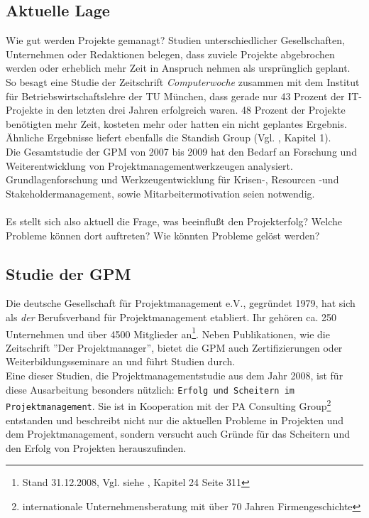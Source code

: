 \documentclass[12pt]{scrartcl}
\begin{document}
\subsection{Aktuelle Lage}

Wie gut werden Projekte gemanagt? Studien unterschiedlicher Gesellschaften, Unternehmen oder Redaktionen belegen, dass zuviele Projekte abgebrochen werden oder erheblich mehr Zeit in Anspruch nehmen als ursprünglich geplant. So besagt eine Studie der Zeitschrift \textit{Computerwoche} zusammen mit dem Institut für Betriebswirtschaftslehre der TU München, dass gerade nur 43 Prozent der IT-Projekte in den letzten drei Jahren erfolgreich waren. 48 Prozent der Projekte benötigten mehr Zeit, kosteten mehr oder hatten ein nicht geplantes Ergebnis.\\
Ähnliche Ergebnisse liefert ebenfalls die Standish Group (Vgl. \cite{profPM}, Kapitel 1). \\
Die Gesamtstudie der GPM von 2007 bis 2009 hat den Bedarf an Forschung und Weiterentwicklung von Projektmanagementwerkzeugen analysiert. Grundlagenforschung und Werkzeugentwicklung für Krisen-, Resourcen -und Stakeholdermanagement, sowie Mitarbeitermotivation seien notwendig.\\
\\
Es stellt sich also aktuell die Frage, was beeinflußt den Projekterfolg? Welche Probleme können dort auftreten? Wie könnten Probleme gelöst werden?

\subsection{Studie der GPM}
\label{studies_gpm}

Die deutsche Gesellschaft für Projektmanagement e.V., gegründet 1979, hat sich als \textit{der} Berufsverband für Projektmanagement etabliert. Ihr gehören ca. 250 Unternehmen und  über 4500 Mitglieder an\footnote{Stand 31.12.2008, Vgl. siehe \cite{proj_zum_erfolg_fuehren}, Kapitel 24 Seite 311}. Neben Publikationen, wie die Zeitschrift ''Der Projektmanager'', bietet die GPM auch Zertifizierungen oder Weiterbildungsseminare an und führt Studien durch. \\
Eine dieser Studien, die Projektmanagementstudie aus dem Jahr 2008, ist für diese Ausarbeitung besonders nützlich: \texttt{Erfolg und Scheitern im Projektmanagement}. Sie ist in Kooperation mit der PA Consulting Group\footnote{internationale Unternehmensberatung mit über 70 Jahren Firmengeschichte} entstanden und beschreibt nicht nur die aktuellen Probleme in Projekten und dem Projektmanagement, sondern versucht auch Gründe für das Scheitern und den Erfolg von Projekten herauszufinden. 
\end{document}
